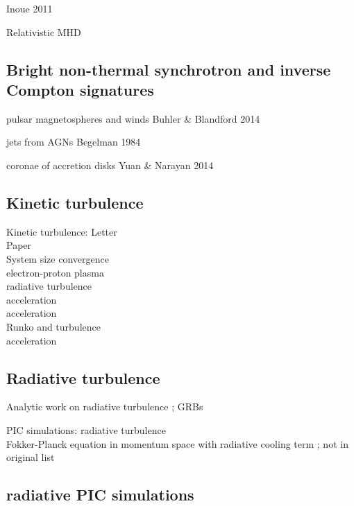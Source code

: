 \documentclass{aa}
\begin{document}
\citep{Cho_2005}
Inoue 2011
\citep{Cho_2014}
\citep{Zrake_2016}

Relativistic MHD
\citep{Zrake_2012}
\citep{Zrake_2014}

\subsection{Bright non-thermal synchrotron and inverse Compton signatures}
pulsar magnetospheres and winds 
Buhler \& Blandford 2014

jets from AGNs Begelman 1984

coronae of accretion disks
Yuan \& Narayan 2014

\subsection{Kinetic turbulence}

Kinetic turbulence:
\citep{Zhdankin_2017a} Letter\\
\citep{Zhdankin_2017b} Paper\\
\citep{Zhdankin_2018} System size convergence\\
\citep{Zhdankin_2019a} electron-proton plasma\\
\citep{Zhdankin_2019b} radiative turbulence\\
\citep{Comisso_2018} acceleration\\
\citep{Wong_2019} acceleration\\
\citep{Nattila_2019} Runko and turbulence\\
\citep{Comisso_2019} acceleration\\

\subsection{Radiative turbulence}

Analytic work on radiative turbulence
\citep{Uzdensky_2018}
\citep{Zrake_2018}; GRBs
\citep{Sobacchi_2019}

PIC simulations:
\citep{Zhdankin_2019b} radiative turbulence\\

Fokker-Planck equation in momentum space with radiative cooling term
\citep{Schlickeiser_1984, Schlickeiser_1985}; not in original list \citep{Schlickeiser_1989}
\citep{Stawarz_2008}


\subsection{radiative PIC simulations}
\end{document}
